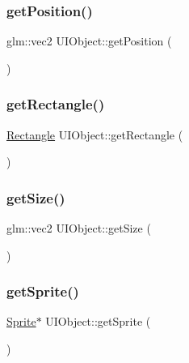 \subsubsection{\texorpdfstring{get\+Position()}{getPosition()}}
{\footnotesize\ttfamily glm\+::vec2 U\+I\+Object\+::get\+Position (\begin{DoxyParamCaption}{ }\end{DoxyParamCaption})\hspace{0.3cm}{\ttfamily [inline]}}

\mbox{\label{class_u_i_object_a187f353380f78615200fba7f8dfba44a}} 
\subsubsection{\texorpdfstring{get\+Rectangle()}{getRectangle()}}
{\footnotesize\ttfamily \hyperlink{class_rectangle}{Rectangle} U\+I\+Object\+::get\+Rectangle (\begin{DoxyParamCaption}{ }\end{DoxyParamCaption})\hspace{0.3cm}{\ttfamily [inline]}}

\mbox{\label{class_u_i_object_a18ca5451ce1d3b6a17ec334660098cca}} 
\subsubsection{\texorpdfstring{get\+Size()}{getSize()}}
{\footnotesize\ttfamily glm\+::vec2 U\+I\+Object\+::get\+Size (\begin{DoxyParamCaption}{ }\end{DoxyParamCaption})\hspace{0.3cm}{\ttfamily [inline]}}

\mbox{\label{class_u_i_object_a416b659a6965e66da7d29ad995a265e9}} 
\subsubsection{\texorpdfstring{get\+Sprite()}{getSprite()}}
{\footnotesize\ttfamily \hyperlink{class_sprite}{Sprite}$\ast$ U\+I\+Object\+::get\+Sprite (\begin{DoxyParamCaption}{ }\end{DoxyParamCaption})\hspace{0.3cm}{\ttfamily [inline]}}


